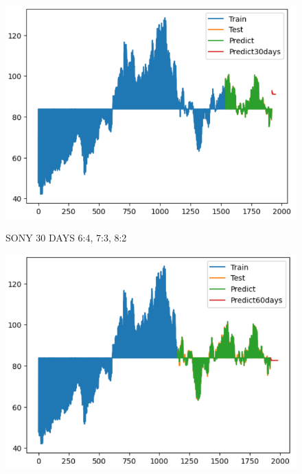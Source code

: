 \documentclass{article}
\begin{document}
\begin{multicols}{2}
\begin{figure}[H]
\begin{minipage}{0.15\textwidth}
    \label{fig:2}
    \end{minipage}%
    \begin{minipage}{0.15\textwidth}
    \centering
    \includegraphics[width=1\textwidth]{Image/XGBoost/SONY_8_2_30.png}

    \label{fig:3}
    \end{minipage}
    \caption{SONY 30 DAYS  6:4, 7:3, 8:2 }
\end{figure}


\begin{figure}[H]
    \centering
    \begin{minipage}{0.15\textwidth}
    \centering
    \includegraphics[width=1\textwidth]{Image/XGBoost/SONY_6_4_60.png}
   

\end{minipage}
\end{figure}
\end{multicols}
\end{document}
